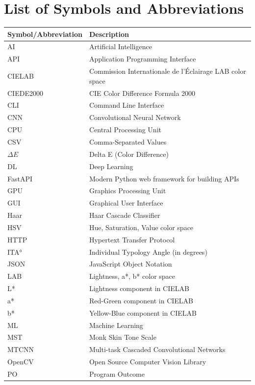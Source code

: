 \newpage
\section*{List of Symbols and Abbreviations}

\begin{table}[h]
\begin{tabular}{ll}
\textbf{Symbol/Abbreviation} & \textbf{Description} \\
\hline
AI & Artificial Intelligence \\
API & Application Programming Interface \\
CIELAB & Commission Internationale de l'Éclairage LAB color space \\
CIEDE2000 & CIE Color Difference Formula 2000 \\
CLI & Command Line Interface \\
CNN & Convolutional Neural Network \\
CPU & Central Processing Unit \\
CSV & Comma-Separated Values \\
$\Delta E$ & Delta E (Color Difference) \\
DL & Deep Learning \\
FastAPI & Modern Python web framework for building APIs \\
GPU & Graphics Processing Unit \\
GUI & Graphical User Interface \\
Haar & Haar Cascade Classifier \\
HSV & Hue, Saturation, Value color space \\
HTTP & Hypertext Transfer Protocol \\
ITA° & Individual Typology Angle (in degrees) \\
JSON & JavaScript Object Notation \\
LAB & Lightness, a*, b* color space \\
L* & Lightness component in CIELAB \\
a* & Red-Green component in CIELAB \\
b* & Yellow-Blue component in CIELAB \\
ML & Machine Learning \\
MST & Monk Skin Tone Scale \\
MTCNN & Multi-task Cascaded Convolutional Networks \\
OpenCV & Open Source Computer Vision Library \\
PO & Program Outcome \\

\end{tabular}
\end{table}
